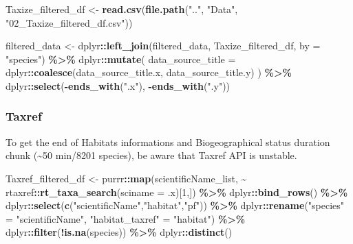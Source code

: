 \documentclass[
]{article}
\newenvironment{Shaded}{\begin{snugshade}}{\end{snugshade}}
\newcommand{\AttributeTok}[1]{\textcolor[rgb]{0.13,0.29,0.53}{#1}}
\newcommand{\DecValTok}[1]{\textcolor[rgb]{0.00,0.00,0.81}{#1}}
\newcommand{\FunctionTok}[1]{\textcolor[rgb]{0.13,0.29,0.53}{\textbf{#1}}}
\newcommand{\NormalTok}[1]{#1}
\newcommand{\OtherTok}[1]{\textcolor[rgb]{0.56,0.35,0.01}{#1}}
\newcommand{\SpecialCharTok}[1]{\textcolor[rgb]{0.81,0.36,0.00}{\textbf{#1}}}
\newcommand{\StringTok}[1]{\textcolor[rgb]{0.31,0.60,0.02}{#1}}
\begin{document}
\begin{Shaded}
\begin{Highlighting}[]
\NormalTok{Taxize\_filtered\_df }\OtherTok{\textless{}{-}} \FunctionTok{read.csv}\NormalTok{(}\FunctionTok{file.path}\NormalTok{(}\StringTok{".."}\NormalTok{, }\StringTok{"Data"}\NormalTok{, }\StringTok{"02\_Taxize\_filtered\_df.csv"}\NormalTok{))}

\NormalTok{filtered\_data }\OtherTok{\textless{}{-}}\NormalTok{ dplyr}\SpecialCharTok{::}\FunctionTok{left\_join}\NormalTok{(filtered\_data, Taxize\_filtered\_df, }\AttributeTok{by =} \StringTok{"species"}\NormalTok{) }\SpecialCharTok{\%\textgreater{}\%}
\NormalTok{  dplyr}\SpecialCharTok{::}\FunctionTok{mutate}\NormalTok{(}
    \AttributeTok{data\_source\_title =}\NormalTok{ dplyr}\SpecialCharTok{::}\FunctionTok{coalesce}\NormalTok{(data\_source\_title.x, data\_source\_title.y)}
\NormalTok{  ) }\SpecialCharTok{\%\textgreater{}\%}
\NormalTok{  dplyr}\SpecialCharTok{::}\FunctionTok{select}\NormalTok{(}\SpecialCharTok{{-}}\FunctionTok{ends\_with}\NormalTok{(}\StringTok{".x"}\NormalTok{), }\SpecialCharTok{{-}}\FunctionTok{ends\_with}\NormalTok{(}\StringTok{".y"}\NormalTok{))}
\end{Highlighting}
\end{Shaded}

\hypertarget{taxref}{%
\subsubsection{Taxref}\label{taxref}}

To get the end of Habitats informations and Biogeographical status
duration chunk (\textasciitilde50 min/8201 species), be aware that
Taxref API is unstable.

\begin{Shaded}
\begin{Highlighting}[]
\NormalTok{Taxref\_filtered\_df }\OtherTok{\textless{}{-}} 
\NormalTok{  purrr}\SpecialCharTok{::}\FunctionTok{map}\NormalTok{(scientificName\_list, }\SpecialCharTok{\textasciitilde{}}\NormalTok{ rtaxref}\SpecialCharTok{::}\FunctionTok{rt\_taxa\_search}\NormalTok{(}\AttributeTok{sciname =}\NormalTok{ .x)[}\DecValTok{1}\NormalTok{,]) }\SpecialCharTok{\%\textgreater{}\%}
\NormalTok{  dplyr}\SpecialCharTok{::}\FunctionTok{bind\_rows}\NormalTok{() }\SpecialCharTok{\%\textgreater{}\%}
\NormalTok{  dplyr}\SpecialCharTok{::}\FunctionTok{select}\NormalTok{(}\FunctionTok{c}\NormalTok{(}\StringTok{"scientificName"}\NormalTok{,}\StringTok{"habitat"}\NormalTok{,}\StringTok{"pf"}\NormalTok{)) }\SpecialCharTok{\%\textgreater{}\%} 
\NormalTok{  dplyr}\SpecialCharTok{::}\FunctionTok{rename}\NormalTok{(}\StringTok{"species"} \OtherTok{=} \StringTok{"scientificName"}\NormalTok{,}
                \StringTok{"habitat\_taxref"} \OtherTok{=} \StringTok{"habitat"}\NormalTok{) }\SpecialCharTok{\%\textgreater{}\%}
\NormalTok{  dplyr}\SpecialCharTok{::}\FunctionTok{filter}\NormalTok{(}\SpecialCharTok{!}\FunctionTok{is.na}\NormalTok{(species)) }\SpecialCharTok{\%\textgreater{}\%}
\NormalTok{  dplyr}\SpecialCharTok{::}\FunctionTok{distinct}\NormalTok{()}
\end{Highlighting}
\end{Shaded}
\end{document}
